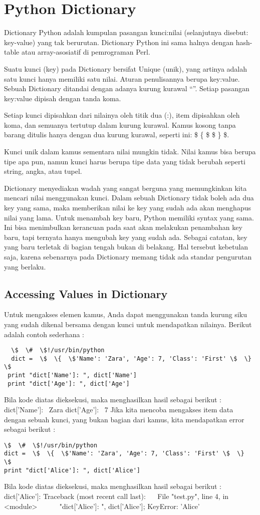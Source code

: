 \section{Python Dictionary}
Dictionary Python adalah kumpulan pasangan kunci:nilai (selanjutnya disebut: key-value) yang tak berurutan. Dictionary Python ini sama halnya dengan hash-table atau array-asosiatif di pemrograman Perl.

Suatu kunci (key) pada Dictionary bersifat Unique (unik), yang artinya adalah satu kunci hanya memiliki satu nilai. Aturan penulisannya berupa key:value. Sebuah Dictionary ditandai dengan adanya kurung kurawal “{}”. Setiap pasangan key:value dipisah dengan tanda koma. 

Setiap kunci dipisahkan dari nilainya oleh titik dua (:), item dipisahkan oleh koma, dan semuanya tertutup dalam kurung kurawal. Kamus kosong tanpa barang ditulis hanya dengan dua kurung kurawal, seperti ini:  \$  \{  \$ \$  \}  \$.

Kunci unik dalam kamus sementara nilai mungkin tidak. Nilai kamus bisa berupa tipe apa pun, namun kunci harus berupa tipe data yang tidak berubah seperti string, angka, atau tupel.

Dictionary menyediakan wadah yang sangat berguna yang memungkinkan kita mencari nilai menggunakan kunci\cite{oliphant2007python}. Dalam sebuah Dictionary tidak boleh ada dua key yang sama, maka memberikan nilai ke key yang sudah ada akan menghapus nilai yang lama. Untuk menambah key baru, Python memiliki syntax yang sama. Ini bisa menimbulkan kerancuan pada saat akan melakukan penambahan key baru, tapi ternyata hanya mengubah key yang sudah ada. Sebagai catatan, key yang baru terletak di bagian tengah bukan di belakang. Hal tersebut kebetulan saja, karena sebenarnya pada Dictionary memang tidak ada standar pengurutan yang berlaku.

\subsection{Accessing Values in Dictionary}
Untuk mengakses elemen kamus, Anda dapat menggunakan tanda kurung siku yang sudah dikenal bersama dengan kunci untuk mendapatkan nilainya. Berikut adalah contoh sederhana :
\begin{verbatim}  
  \$  \#  \$!/usr/bin/python
  dict =  \$  \{  \$'Name': 'Zara', 'Age': 7, 'Class': 'First' \$  \}  \$ 
 print "dict['Name']: ", dict['Name'] 
 print "dict['Age']: ", dict['Age']
\end{verbatim}
Bila kode diatas dieksekusi, maka menghasilkan hasil sebagai berikut :
dict['Name']:~ Zara
dict['Age']:~ 7 
Jika kita mencoba mengakses item data dengan sebuah kunci, yang bukan bagian dari kamus, kita mendapatkan error sebagai berikut :
\begin{verbatim} 
\$  \#  \$!/usr/bin/python
dict =  \$  \{  \$'Name': 'Zara', 'Age': 7, 'Class': 'First' \$  \}  \$ 
print "dict['Alice']: ", dict['Alice']
\end{verbatim}
Bila kode diatas dieksekusi, maka menghasilkan hasil sebagai berikut :
dict['Alice']: 
Traceback (most recent call last):
~~ File "test.py", line 4, in <module>
~~~~~  \print "dict['Alice']: ", dict['Alice']; 
KeyError: 'Alice' 

